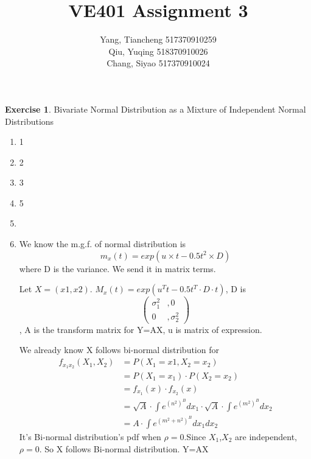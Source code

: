\documentclass[12pt,a4paper]{article}
\makeatletter
\theoremstyle{definition}
\newtheorem{exercise}{Exercise}
\newtheorem*{solution}{Solution}
\renewenvironment{solution}[1][Solution] {\par\pushQED{\qed}\normalfont\topsep6\p@\@plus6\p@\relax\trivlist\item[\hskip\labelsep\bfseries#1\@addpunct{.}]\ignorespaces}{\popQED\endtrivlist\@endpefalse} \makeatother
\makeatother
\begin{document}
\title{VE401 Assignment 3}
\author{Yang, Tiancheng 517370910259\\Qiu, Yuqing 518370910026\\Chang, Siyao 517370910024}

\maketitle

\newpage

\setcounter{exercise}{10}
\begin{exercise}
Bivariate Normal Distribution as a Mixture of Independent Normal Distributions
\end{exercise}
\begin{enumerate}[label=\roman*)]
    \item 1
    \item 2
    \item 3
    \item 5
    \item \begin{solution}
        We know the m.g.f. of normal distribution is
        \begin{equation*}
            m_x\left(t\right)=exp\left(u\times t-0.5t^2\times D\right)
        \end{equation*}
        where D is the variance. We send it in matrix terms.

        Let $X=(x1,x2)$. $M_x(t)=exp(u^Tt-0.5t^T\cdot D\cdot t)$, D is 
        \begin{equation*}
            \begin{pmatrix}
                \sigma_1^2&,0\\
                0&,\sigma_2^2
            \end{pmatrix}
        \end{equation*}
        , A is the transform matrix for Y=AX, u is matrix of expression.
        
        We already know X follows bi-normal distribution for 
        \begin{equation*}
            \begin{split}
                f_{x_1x_2}(X_1,X_2)&=P(X_1=x1,X_2=x_2)\\
                &=P(X_1=x_1)\cdot P(X_2=x_2)\\
                &=f_{x_1}(x)\cdot f_{x_2}(x)\\
                &=\sqrt{A}\cdot \int e^{(n^2)^B}dx_1\cdot \sqrt{A}\cdot \int e^{(m^2)^B}dx_2\\
                &=A\cdot \int e^{(m^2+n^2)^B} dx_1 dx_2
            \end{split}
        \end{equation*}
        It’s Bi-normal distribution’s pdf when $\rho=0$.Since $X_1$,$X_2$ are independent, $\rho=0$. So X follows Bi-normal distribution. Y=AX
        

\end{solution}
\end{enumerate}
\end{document}
